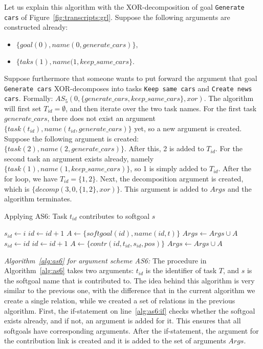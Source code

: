 Let us explain this algorithm with the XOR-decomposition of goal \texttt{Generate cars} of Figure~\ref{fig:transcripts:grl}. Suppose the following arguments are constructed already:
\begin{itemize}
\item $\{goal(0),name(0,generate\_cars)\},$
\item $\{taks(1),name(1,keep\_same\_cars\}.$
\end{itemize}
Suppose furthermore that someone wants to put forward the argument that goal \texttt{Generate cars} XOR-decomposes into tasks \texttt{Keep same cars} and \texttt{Create news cars}. Formally: $AS_5(0,\{generate\_cars,keep\_same\_cars\},xor)$. The algorithm will first set $T_{id}=\emptyset$, and then iterate over the two task names. For the first task $generate\_cars$, there does not exist an argument $\{task(t_{id}),name(t_{id},generate\_cars)\}$ yet, so a  new argument is created. Suppose the following argument is created: $\{task(2),name(2,generate\_cars)\}.$ After this, 2 is added to $T_{id}$. For the second task an argument exists already, namely $\{task(1),name(1,keep\_same\_cars)\}$, so 1 is simply added to $T_{id}$. After the for loop, we have $T_{id}=\{1,2\}$. Next, the decomposition argument is created, which is $\{decomp(3,0,\{1,2\},xor)\}$. This argument is added to $Args$ and the algorithm terminates.

\begin{algorithm}[h]
  \caption{Applying AS6: Task $t_{id}$ contributes to softgoal $s$}\label{alg:as6}
  \begin{algorithmic}[1]
     \label{alg:as6:if}
        \State $s_{id} \gets i$
    \Else
      \State $id\gets id+1$
      \State $A \gets \{softgoal(id),name(id,t)\}$
      \State $Args \gets Args\cup A$
      \State $s_{id} \gets id$
    \EndIf
    \State $id\gets id+1$
    \State $A\gets \{contr(id, t_{id}, s_{id}, pos)\}$
    \State $Args \gets Args\cup A$
    \EndProcedure
  \end{algorithmic}
\end{algorithm}

\emph{Algorithm~\ref{alg:as6} for argument scheme AS6:} The procedure in Algorithm~\ref{alg:as6} takes two arguments: $t_{id}$ is the identifier of task $T$, and $s$ is the softgoal name that is contributed to. The idea behind this algorithm is very similar to the previous one, with the difference that in the current algorithm we create a single relation, while we created a set of relations in the previous algorithm. First, the if-statement on line~\ref{alg:as6:if} checks whether the softgoal exists already, and if not, an argument is added for it. This ensures that all softgoals have corresponding arguments. After the if-statement, the argument for the contribution link is created and it is added to the set of arguments $Args$. 

